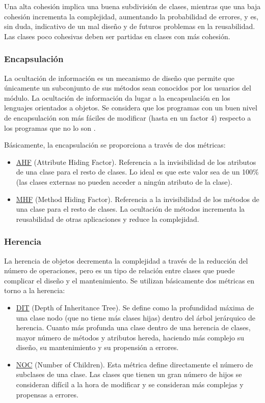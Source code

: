 \documentclass[11pt]{article}
\begin{document}
Una alta cohesión implica una buena subdivisión de clases, mientras que una baja cohesión incrementa la complejidad, aumentando la probabilidad de errores, y es, sin duda, indicativo de un mal diseño y de futuros problemas en la reusabilidad. Las clases poco cohesivas deben ser partidas en clases con más cohesión.

\subsubsection{Encapsulación}
La ocultación de información es un mecanismo de diseño que permite que únicamente un subconjunto de sus métodos sean conocidos por los usuarios del módulo. La ocultación de información da lugar a la encapsulación en los lenguajes orientados a objetos. Se considera que los programas con un buen nivel de encapsulación son más fáciles de modificar (hasta en un factor 4) respecto a los programas que no lo son \cite{improving:softwareproductivity}.

Básicamente, la encapsulación se proporciona a través de dos métricas:

\begin{itemize}
\item{\underline{AHF} (Attribute Hiding Factor)}. Referencia a la invisibilidad de los atributos de una clase para el resto de clases. Lo ideal es que este valor sea de un 100\% (las clases externas no pueden acceder a ningún atributo de la clase).
\item{\underline{MHF} (Method Hiding Factor)}. Referencia a la invisibilidad de los métodos de una clase para el resto de clases. La ocultación de métodos incrementa la reusabilidad de otras aplicaciones y reduce la complejidad.
\end{itemize}

\subsubsection{Herencia}
La herencia de objetos decrementa la complejidad a través de la reducción del número de operaciones, pero es un tipo de relación entre clases que puede complicar el diseño y el mantenimiento. Se utilizan básicamente dos métricas en torno a la herencia:

\begin{itemize}
\item{\underline{DIT} (Depth of Inheritance Tree)}. Se define como la profundidad máxima de una clase nodo (que no tiene más clases hijas) dentro del árbol jerárquico de herencia. Cuanto más profunda una clase dentro de una herencia de clases, mayor número de métodos y atributos hereda, haciendo más complejo su diseño, su mantenimiento y su propensión a errores. 
\item{\underline{NOC} (Number of Children)}. Esta métrica define directamente el número de subclases de una clase. Las clases que tienen un gran número de hijos se consideran difícil a la hora de modificar y se consideran más complejas y propensas a errores.
\end{itemize}
\end{document}

